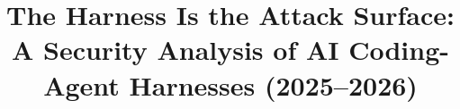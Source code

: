\documentclass[conference]{IEEEtran}
\begin{document}
\title{The Harness Is the Attack Surface: A Security Analysis of AI Coding-Agent Harnesses (2025--2026)}

\author{}

\maketitle
















\appendices




\end{document}
